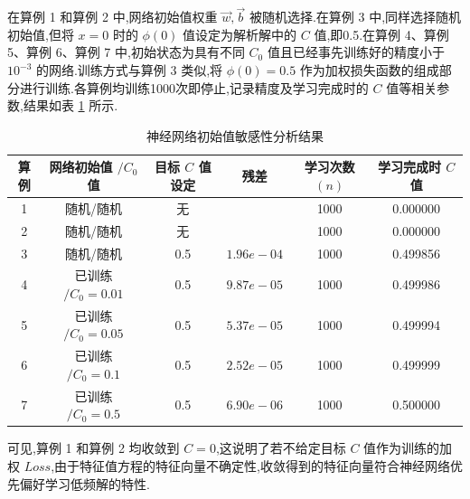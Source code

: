 \documentclass{Sichuan Normal University}
\begin{document}
在算例 1 和算例 2 中,网络初始值权重 ${\vec{w}, \vec{b}}$ 被随机选择.在算例 3 中,同样选择随机初始值,但将 $x=0$ 时的 $\phi(0)$ 值设定为解析解中的 $C$ 值,即0.5.在算例 4、算例 5、算例 6、算例 7 中,初始状态为具有不同 $C_0$ 值且已经事先训练好的精度小于 $10^{-3}$ 的网络.训练方式与算例 3 类似,将 $\phi(0)=0.5$ 作为加权损失函数的组成部分进行训练.各算例均训练1000次即停止,记录精度及学习完成时的 $C$ 值等相关参数,结果如表 \ref{tab:sensitivity_analysis_results} 所示.
\begin{table}[H]
    \caption{神经网络初始值敏感性分析结果}
    \centering
    \begin{tabular}{cccccc}
        \toprule
        \textbf{算例} & \textbf{网络初始值 $/ C_0$ 值} & \textbf{目标 $C$ 值设定} & 残差 & \textbf{学习次数 $(n)$} & \textbf{学习完成时 $C$ 值} \\
        \midrule
        1 & 随机/随机 & 无 &  & 1000 & 0.000000 \\
        2 & 随机/随机 & 无 &  & 1000 & 0.000000 \\
        3 & 随机/随机 & 0.5 & $1.96e-04$ & 1000 & 0.499856 \\
        4 & 已训练 $/ C_0=0.01$ & 0.5 & $9.87e-05$ & 1000 & 0.499986 \\
        5 & 已训练 $/ C_0=0.05$ & 0.5 & $5.37e-05$ & 1000 & 0.499994 \\
        6 & 已训练 $/ C_0=0.1$ & 0.5 & $2.52e-05$ & 1000 & 0.499999 \\
        7 & 已训练 $/ C_0=0.5$ & 0.5 & $6.90e-06$ & 1000 & 0.500000 \\
        \bottomrule
    \end{tabular}
    \label{tab:sensitivity_analysis_results}
\end{table}
可见,算例 1 和算例 2 均收敛到 $C=0$,这说明了若不给定目标 $C$ 值作为训练的加权 $Loss$,由于特征值方程的特征向量不确定性,收敛得到的特征向量符合神经网络优先偏好学习低频解的特性.
\end{document}
